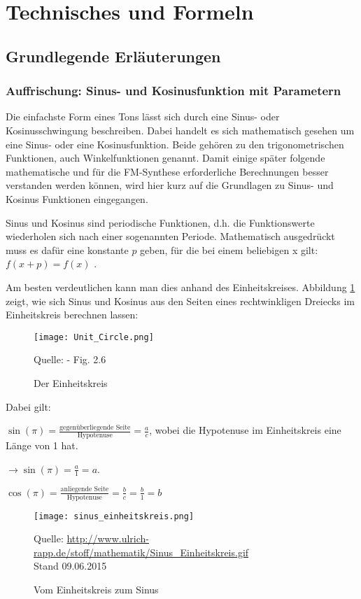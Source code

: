 \section{Technisches und Formeln}

\FloatBarrier
\subsection{Grundlegende Erläuterungen}
\subsubsection{Auffrischung: Sinus- und Kosinusfunktion mit Parametern}
Die einfachste Form eines Tons lässt sich durch eine Sinus- oder Kosinusschwingung beschreiben. Dabei handelt es sich mathematisch gesehen um eine Sinus- oder eine Kosinusfunktion. Beide gehören zu den trigonometrischen Funktionen, auch Winkelfunktionen genannt. Damit einige später folgende mathematische und für die FM-Synthese erforderliche Berechnungen besser verstanden werden können, wird hier kurz auf die Grundlagen zu Sinus- und Kosinus Funktionen eingegangen. 

Sinus und Kosinus sind periodische Funktionen, d.h. die Funktionswerte wiederholen sich nach einer sogenannten Periode. Mathematisch ausgedrückt muss es dafür eine konstante $p$  geben, für die bei einem beliebigen x gilt: $f(x + p) =  f(x)$ .

Am besten verdeutlichen kann man dies anhand des Einheitskreises. Abbildung \ref{fig:unitcircle} zeigt, wie sich Sinus und Kosinus aus den Seiten eines rechtwinkligen Dreiecks im Einheitskreis berechnen lassen:

\begin{figure} [ht]
\centering
\texttt{[image: Unit\_Circle.png]}
\caption{Der Einheitskreis}
\label{fig:unitcircle}
Quelle: \cite{fmtheory} - Fig. 2.6
\end{figure}

Dabei gilt: 

$\sin(\pi) = \frac{\text{gegenüberliegende Seite}}{\text{Hypotenuse}} = \frac{a}{c}$, wobei die Hypotenuse im Einheitskreis eine Länge von 1 hat. 

$\to\sin(\pi) = \frac{a}{1} = a$.

$\cos(\pi) = \frac{\text{anliegende Seite}}{\text{Hypotenuse}} = \frac{b}{c} = \frac{b}{1} = b$ \cite[s. 22 - 27]{fmtheory} \\

\begin{figure} [ht]
\centering
\texttt{[image: sinus\_einheitskreis.png]}
\caption{Vom Einheitskreis zum Sinus}
\label{fig:unitcircleToSinus}
Quelle: \url{http://www.ulrich-rapp.de/stoff/mathematik/Sinus_Einheitskreis.gif}
\\Stand 09.06.2015
\end{figure}

